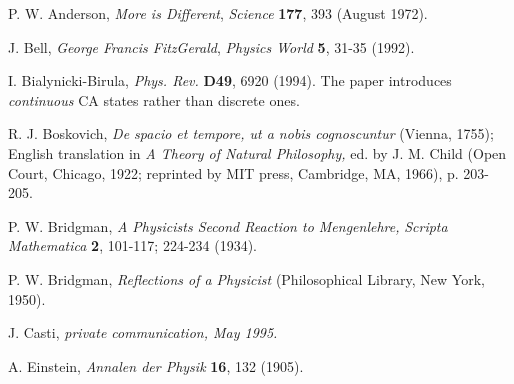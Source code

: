 \documentclass[pra,amsfonts, twocolumn]{revtex4}
\begin{document}
\begin{thebibliography}{99}

P. W. Anderson,
{\it More is Different},
{\sl Science} {\bf 177}, 393 (August 1972).

%
 J. Bell,
 {\it George Francis FitzGerald},
 {\sl Physics World}
 {\bf 5}, 31-35 (1992).

 I. Bialynicki-Birula, {\sl Phys. Rev.} {\bf D49}, 6920 (1994).
 The paper introduces {\em continuous} CA states rather than discrete
 ones.


%

 R. J. Boskovich,
 {\sl De spacio et tempore, ut a nobis cognoscuntur} (Vienna, 1755);
 English translation in {\sl A Theory of Natural Philosophy,} ed. by
 J. M. Child (Open Court, Chicago, 1922; reprinted by MIT press,
 Cambridge, MA, 1966), p. 203-205.


P. W. Bridgman,
{\sl A Physicists Second Reaction to
Mengenlehre,}
{\sl Scripta Mathematica} {\bf 2}, 101-117; 224-234 (1934).

P. W. Bridgman,
{\sl Reflections of a Physicist}
(Philosophical Library, New York, 1950).

J. Casti, {\it private communication, May 1995.}


%
A. Einstein, {\sl Annalen der Physik} {\bf 16}, 132 (1905).
%


\end{thebibliography}
\end{document}

